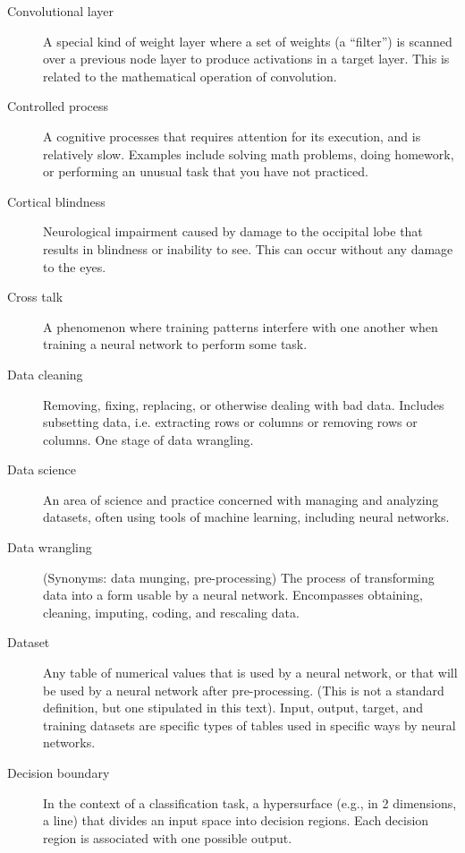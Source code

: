 \begin{description}
\item[Convolutional layer] A special kind of weight layer where a set of weights (a ``filter'') is scanned over a previous node layer to produce activations in a target layer. This is related to the mathematical operation of convolution.

\item[Controlled process] A cognitive processes that requires attention for its execution, and is relatively slow. Examples include solving math problems, doing homework, or performing an  unusual task that you have not practiced.

\item[Cortical blindness] Neurological impairment caused by damage to the occipital lobe that results in blindness or inability to see. This can occur without any damage to the eyes. 

\item[Cross talk] A phenomenon where training patterns interfere with one another when training a neural network to perform some task. 

\item[Data cleaning] Removing, fixing, replacing, or otherwise dealing with bad data. Includes subsetting data, i.e. extracting rows or columns or removing rows or columns. One stage of data wrangling.

\item[Data science]  An area of science and practice concerned with managing and analyzing datasets, often using tools of machine learning, including neural networks.

\item[Data wrangling] (Synonyms: data munging, pre-processing) The process of transforming data into a form usable by a neural network. Encompasses obtaining, cleaning, imputing, coding, and rescaling data. 

\item[Dataset] Any table of numerical values that is used by a neural network, or that will be used by a neural network after pre-processing. (This is not a standard definition, but one stipulated in this text). Input, output, target, and training datasets are specific types of tables used in specific ways by neural networks.

\item[Decision boundary] In the context of a classification task, a hypersurface (e.g., in 2 dimensions, a line) that divides an input space into decision regions. Each decision region is associated with one possible output.


\end{description}
